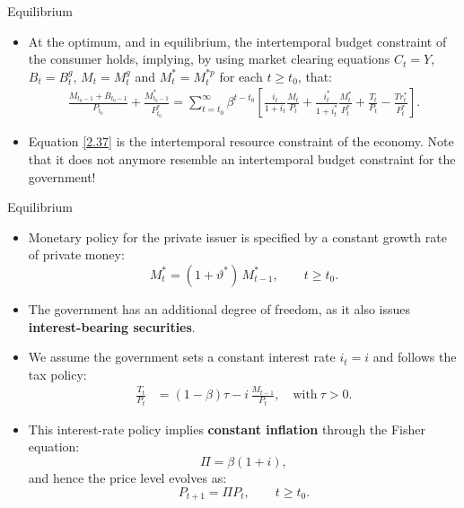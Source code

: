 \documentclass[11pt,aspectratio=169]{beamer}
\begin{document}
\begin{frame}{Equilibrium}
\begin{itemize}

\item At the optimum, and in equilibrium, the intertemporal budget constraint of the consumer holds, implying, by using market clearing equations $C_t = Y$, $B_t = B_t^g$, $M_t=M_t^g$ and $M_t^* = M_t^{*p}$ for each $t \ge t_0$, that:
\vspace{0.1em}
\begin{align}
    \frac{M_{t_{0}-1} + B_{t_{0}-1}}{P_{t_{0}}} + \frac{M_{t_{0}-1}^{*}}{P_{t_{0}}^{*}} = \sum_{t=t_{0}}^{\infty} \beta^{t-t_{0}} \left[ \frac{i_{t}}{1+i_{t}}\frac{M_{t}}{P_{t}} + \frac{i_{t}^{*}}{1+i_{t}^{*}}\frac{M_{t}^{*}}{P_{t}^{*}} + \frac{T_{t}}{P_{t}} - \frac{T r_{t}^{*}}{P_{t}^{*}} \right]. \label{2.37}
\end{align}
\vspace{0.1em}
\item Equation \eqref{2.37} is the intertemporal resource constraint of the economy. Note that it does not anymore resemble an intertemporal budget constraint for the government!

\end{itemize}
\end{frame}



\begin{frame}{Equilibrium}
\small
\begin{itemize}

    \item Monetary policy for the private issuer is specified by a constant growth rate of private money:
    \[
        M_t^* = (1 + \vartheta^*)\, M_{t-1}^*, 
        \qquad t \ge t_0.
    \]

    \vspace{0.3em}

    \item The government has an additional degree of freedom, as it also issues \textbf{interest-bearing securities}.

    \vspace{0.3em}

    \item We assume the government sets a constant interest rate $i_t = i$ and follows the tax policy:
    \begin{align}
        \frac{T_t}{P_t} 
        &= (1 - \beta)\tau 
        - i\,\frac{M_{t-1}}{P_t}, \quad \text{with} \ \tau > 0.
        \tag{2.38}\label{2.38}
    \end{align}

    \vspace{0.3em}

    \item This interest-rate policy implies \textbf{constant inflation} through the Fisher equation:
    \[
        \Pi = \beta(1+i),
    \]
    and hence the price level evolves as:
    \[
        P_{t+1} = \Pi P_t,
        \qquad t \ge t_0.
    \]

\end{itemize}
\end{frame}
\end{document}
